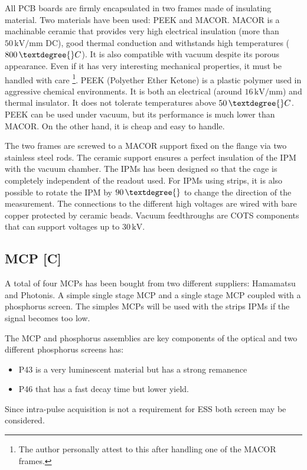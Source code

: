 \begin{refsection}
  All PCB boards are firmly encapsulated in two frames made of insulating material. Two materials have been used: PEEK and MACOR. MACOR is a machinable ceramic that provides very high electrical insulation (more than $50\,\mathrm{kV/mm}$ DC),  good thermal conduction and withstands high temperatures ($800\,\textdegree{}C$). It is also compatible with vacuum despite its porous appearance. Even if it has very interesting mechanical properties, it must be handled with care \footnote{The author personally attest to this after handling one of the MACOR frames.}. PEEK (Polyether Ether Ketone) is a plastic polymer used in aggressive chemical environments. It is both an electrical (around $16\,\mathrm{kV/mm}$) and thermal insulator. It does not tolerate temperatures above $50\,\textdegree{}C$. PEEK can be used under vacuum, but its performance is much lower than MACOR. On the other hand, it is cheap and easy to handle.

  The two frames are screwed to a MACOR support fixed on the flange via two stainless steel rods. The ceramic support ensures a perfect insulation of the IPM with the vacuum chamber. The IPMs has been designed so that the cage is completely independent of the readout used. For IPMs using strips, it is also possible to rotate the IPM by $90\,\textdegree{}$ to change the direction of the measurement. The connections to the different high voltages are wired with bare copper  protected by ceramic beads. Vacuum feedthroughs are COTS components that can support voltages up to $30\,\mathrm{kV}$.

  \subsection{MCP [C]}
  A total of four MCPs has been bought from two different suppliers: Hamamatsu and Photonis. A simple single stage MCP and a single stage MCP coupled with a phosphorus screen. The simples MCPs will be used with the strips IPMs if the signal becomes too low.

  The MCP and phosphorus assemblies are key components of the optical and two different phosphorus screens has:
  \begin{itemize}
    \item P43 is a very luminescent material but has a strong remanence
    \item P46 that has a fast decay time but lower yield.
  \end{itemize}
  Since intra-pulse acquisition is not a requirement for ESS both screen may be considered.


\end{refsection}
